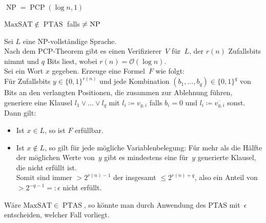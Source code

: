 \documentclass{cheat-sheet}
\DeclareMathOperator{\NP}{NP} %
\let\P\relax %
\DeclareMathOperator{\P}{P} %
\DeclareMathOperator{\PTAS}{PTAS} %
\DeclareMathOperator{\PCP}{PCP} %
\renewcommand{\O}{\mathcal{O}} %
\begin{document}
\begin{resultat}
  $\NP = \PCP(\log n, 1)$
\end{resultat}


\begin{satz}
  $\mathrm{MaxSAT} \not\in \PTAS$ falls $\P \neq \NP$
\end{satz}

\begin{beweisskizze}
  Sei $L$ eine NP-vollständige Sprache. \\
  Nach dem PCP-Theorem gibt es einen Verifizierer~$V$ für~$L$, der $r(n)$ Zufallsbits nimmt und $q$ Bits liest, wobei $r(n) = \O(\log n)$. \\
  Sei ein Wort $x$ gegeben.
  Erzeuge eine Formel~$F$ wie folgt: \\
  Für Zufallsbits $y \in \{ 0, 1 \}^{r(n)}$ und jede Kombination $(b_1, \ldots, b_q) \in \{ 0, 1 \}^q$ von Bits an den verlangten Positionen, die zusammen zur Ablehnung führen, generiere eine Klausel $l_1 \vee \ldots \vee l_q$ mit $l_i \coloneqq v_{y,i}$ falls $b_i = 0$ und $l_i \coloneqq \overline{v_{y,i}}$ sonst.
  Dann gilt:
  \begin{itemize}
    \item Ist $x \in L$, so ist $F$ erfüllbar.
    \item Ist $x \not\in L$, so gilt für jede mögliche Variablenbelegung: Für mehr als die Hälfte der möglichen Werte von~$y$ gibt es mindestens eine für~$y$ generierte Klausel, die nicht erfüllt ist. \\
    Somit sind immer $> 2^{r(n) - 1}$ der insgesamt $\leq 2^{r(n) + q}$, also ein Anteil von $> 2^{-q-1} =: \epsilon$ nicht erfüllt.
  \end{itemize}
  Wäre $\mathrm{MaxSAT} \in \PTAS$, so könnte man durch Anwendung des PTAS mit~$\epsilon$ entscheiden, welcher Fall vorliegt.
\end{beweisskizze}

\end{document}
